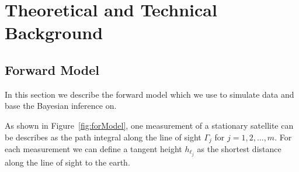 \chapter{Theoretical and Technical Background}

\section{Forward Model}

\begin{figure}[ht!]
	\centering
	\scalebox{0.9}{}
	\label{fig:FirstLIMB}
\end{figure}

In this section we describe the forward model which we use to simulate data and base the Bayesian inference on.

As shown in Figure~\ref{fig:forModel}, one measurement of a stationary satellite can be describes as the path integral along the line of sight $\Gamma_j$ for $j=1,2,\ldots,m$.
For each measurement we can define a tangent height $h_{\ell_j}$ as the shortest distance along the line of sight to the earth.


